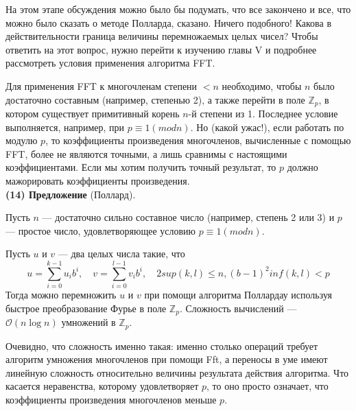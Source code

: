 На этом этапе обсуждения можно было бы подумать, что все 
закончено и все, что можно было сказать о методе Полларда, сказано. Ничего
подобного! Какова в действительности граница величины 
перемножаемых целых чисел? Чтобы ответить на этот вопрос, нужно перейти к
изучению главы V и подробнее рассмотреть условия применения 
алгоритма FFT. \par
 Для применения FFT к многочленам степени $< n$ необходимо, чтобы
$n$ было достаточно составным (например, степенью 2), а также 
перейти в поле $\mathbb{Z}_p$, в котором существует примитивный корень $n$-й степени из 1. Последнее условие выполняется, например, при $p \equiv 1 (mod n)$. Но (какой ужас!), если работать по модулю $p$, то коэффициенты 
произведения многочленов, вычисленные с помощью FFT, более не являются
точными, а лишь сравнимы с настоящими коэффициентами. Если мы
хотим получить точный результат, то $p$ должно мажорировать 
коэффициенты произведения. \\
\textbf{(14) Предложение} (Поллард). \\ 
\par
Пусть $n$ — достаточно сильно составное число (например, степень 2
или 3) и $p$ — простое число, удовлетворяющее условию $p \equiv 1 (mod n)$. 
\pagebreak
\newpage

Пусть $u$ и $v$ — два целых числа такие, что
$$u = \sum\limits^{k-1}_{i = 0}u_{i}b^{i},\quad v = \sum\limits^{l-1}_{i = 0}v_{i}b^{i},\quad 2sup(k,l) \leq n, (b - 1)^{2}inf(k, l) < p$$
Тогда можно перемножить $u$ и $v$ при помощи алгоритма Поллардау 
используя быстрое преобразование Фурье в поле $\mathbb{Z}_p$. Сложность 
вычислений --- $\mathcal{O}(n\log{}n)$  умножений в $\mathbb{Z}_p$.\par
Очевидно, что сложность именно такая: именно столько операций
требует алгоритм умножения многочленов при помощи Fft, а 
переносы в уме имеют линейную сложность относительно величины 
результата действия алгоритма. Что касается неравенства, которому 
удовлетворяет $p$, то оно просто означает, что коэффициенты произведения
многочленов меньше $p$. 

